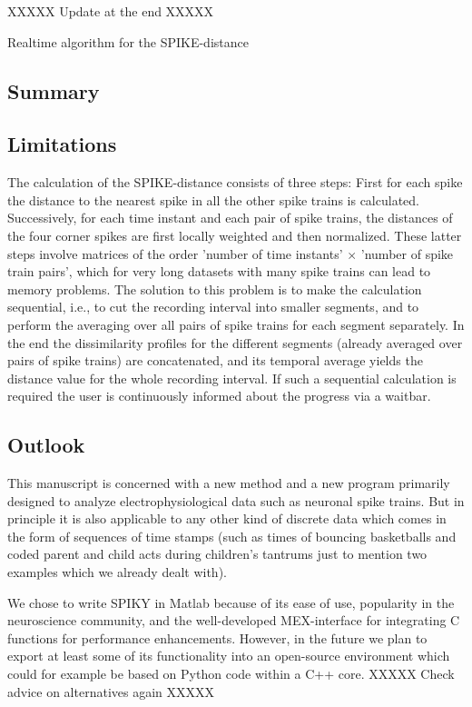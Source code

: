 \documentclass[10pt,twocolumn]{elsart5p}
\begin{document}
XXXXX Update at the end XXXXX

Realtime algorithm for the SPIKE-distance

\subsection{\label{ss:Summary} Summary}

\subsection{\label{ss:Limitations} Limitations}

The calculation of the SPIKE-distance consists of three steps: First for each spike the distance to the nearest spike in all the other spike trains is calculated. Successively, for each time instant and each pair of spike trains, the distances of the four corner spikes are first locally weighted and then normalized. These latter steps involve matrices of the order 'number of time instants' $\times$ 'number of spike train pairs', which for very long datasets with many spike trains can lead to memory problems. The solution to this problem is to make the calculation sequential, i.e., to cut the recording interval into smaller segments, and to perform the averaging over all pairs of spike trains for each segment separately. In the end the dissimilarity profiles for the different segments (already averaged over pairs of spike trains) are concatenated, and its temporal average yields the distance value for the whole recording interval. If such a sequential calculation is required the user is continuously informed about the progress via a waitbar.



\subsection{\label{ss:Outlook} Outlook}

This manuscript is concerned with a new method and a new program primarily designed to analyze electrophysiological data such as neuronal spike trains. But in principle it is also applicable to any other kind of discrete data which comes in the form of sequences of time stamps (such as times of bouncing basketballs and coded parent and child acts during children's tantrums just to mention two examples which we already dealt with).

We chose to write SPIKY in Matlab because of its ease of use, popularity in the neuroscience community, and the well-developed MEX-interface for integrating C functions for performance enhancements. However, in the future we plan to export at least some of its functionality into an open-source environment which could for example be based on Python code within a C++ core. XXXXX Check advice on alternatives again XXXXX
\end{document}
